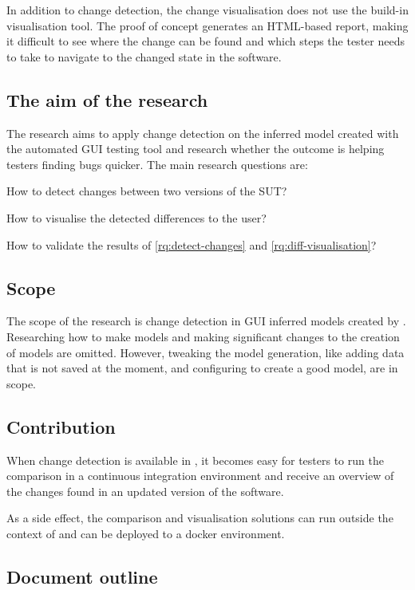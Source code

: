 In addition to change detection, the change visualisation does not use the build-in visualisation tool. The proof of concept generates an HTML-based report, making it difficult to see where the change can be found and which steps the tester needs to take to navigate to the changed state in the software.

\subsection{The aim of the research}
The research aims to apply change detection on the inferred model created with the automated GUI testing tool \testar and research whether the outcome is helping testers finding bugs quicker. The main research questions are:

\begin{questions}
    \item How to detect changes between two versions of the SUT?
	\item How to visualise the detected differences to the user? 
\item How to validate the results of \ref{rq:detect-changes} and \ref{rq:diff-visualisation}?
\end{questions}

\subsection{Scope}
The scope of the research is change detection in GUI inferred models created by \testar. Researching how to make models and making significant changes to the creation of models are omitted. However, tweaking the model generation, like adding data that is not saved at the moment, and configuring \testar to create a good model, are in scope.

\subsection{Contribution}
When change detection is available in \testar, it becomes easy for testers to run the comparison in a continuous integration environment and receive an overview of the changes found in an updated version of the software.

As a side effect, the comparison and visualisation solutions can run outside the context of \testar and can be deployed to a docker environment.

\subsection{Document outline}


